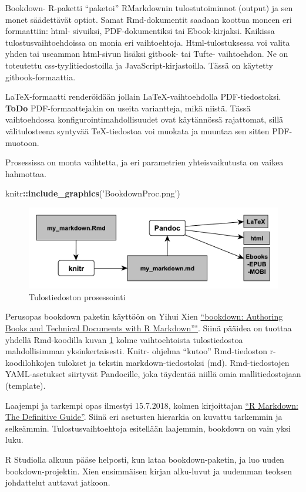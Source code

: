 \documentclass[finnish,]{book}
\newenvironment{Shaded}{\begin{snugshade}}{\end{snugshade}}
\newcommand{\KeywordTok}[1]{\textcolor[rgb]{0.13,0.29,0.53}{\textbf{#1}}}
\newcommand{\NormalTok}[1]{#1}
\newcommand{\OperatorTok}[1]{\textcolor[rgb]{0.81,0.36,0.00}{\textbf{#1}}}
\newcommand{\StringTok}[1]{\textcolor[rgb]{0.31,0.60,0.02}{#1}}
\theoremstyle{definition}
\theoremstyle{definition}
\theoremstyle{definition}
\theoremstyle{remark}
\begin{document}
Bookdown- R-paketti ``paketoi'' RMarkdownin tulostutoiminnot (output) ja
sen monet säädettävät optiot. Samat Rmd-dokumentit saadaan koottua
moneen eri formaattiin: html- sivuiksi, PDF-dokumentiksi tai
Ebook-kirjaksi. Kaikissa tulostusvaihtoehdoissa on monia eri
vaihtoehtoja. Html-tulostuksessa voi valita yhden tai useamman
html-sivun lisäksi gitbook- tai Tufte- vaihtoehdon. Ne on toteutettu
css-tyylitiedostoilla ja JavaScript-kirjastoilla. Tässä on käytetty
gitbook-formaattia.

LaTeX-formaatti renderöidään jollain LaTeX-vaihtoehdolla
PDF-tiedostoksi. \textbf{ToDo} PDF-formaattejakin on useita variantteja,
mikä niistä. Tässä vaihtoehdossa konfigurointimahdollisuudet ovat
käytännössä rajattomat, sillä välitulosteena syntyvää TeX-tiedostoa voi
muokata ja muuntaa sen sitten PDF-muotoon.

Prosessissa on monta vaihtetta, ja eri parametrien yhteisvaikutusta on
vaikea hahmottaa.

\begin{Shaded}
\begin{Highlighting}[]
\NormalTok{knitr}\OperatorTok{::}\KeywordTok{include_graphics}\NormalTok{(}\StringTok{'BookdownProc.png'}\NormalTok{)}
\end{Highlighting}
\end{Shaded}

\begin{figure}

{\centering \includegraphics[width=0.5\linewidth]{BookdownProc} 

}

\caption{Tulostiedoston prosessointi}\label{fig:bdprocess}
\end{figure}

Perusopas bookdown paketin käyttöön on Yihui Xien
\href{https://bookdown.org/yihui/bookdown/}{``bookdown: Authoring Books
and Technical Documents with R Markdown''"}. Siinä pääidea on tuottaa
yhdellä Rmd-koodilla kuvan \ref{fig:bdprocess} kolme vaihtoehtoista
tulostiedostoa mahdollisimman yksinkertaisesti. Knitr- ohjelma ``kutoo''
Rmd-tiedoston r-koodilohkojen tulokset ja tekstin markdown-tiedostoksi
(md). Rmd-tiedostojen YAML-asetukset siirtyvät Pandocille, joka
täydentää niillä omia mallitiedostojaan (template).

Laajempi ja tarkempi opas ilmestyi 15.7.2018, kolmen kirjoittajan
\href{https://bookdown.org/yihui/rmarkdown/}{``R Markdown: The
Definitive Guide''}. Siinä eri asetusten hierarkia on kuvattu tarkemmin
ja selkeämmin. Tulostusvaihtoehtoja esitellään laajemmin, bookdown on
vain yksi luku.

R Studiolla alkuun pääse helposti, kun lataa bookdown-paketin, ja luo
uuden bookdown-projektin. Xien ensimmäisen kirjan alku-luvut ja uudemman
teoksen johdattelut auttavat jatkoon.


\end{document}
